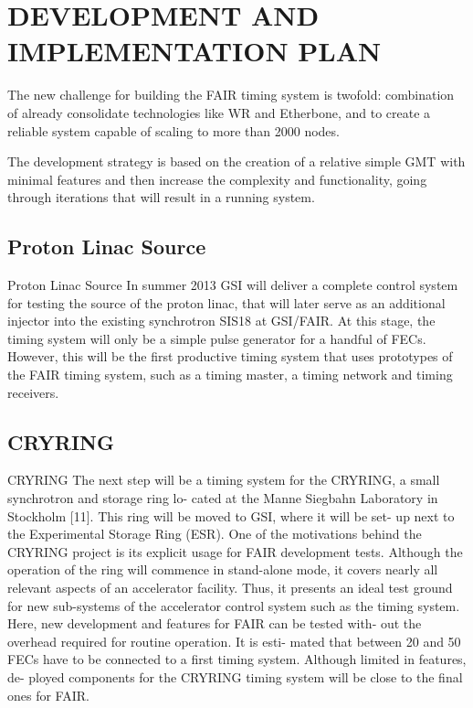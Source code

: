 \section{DEVELOPMENT AND IMPLEMENTATION PLAN}

The new challenge for building the FAIR timing system is
twofold: combination of already consolidate technologies like WR and 
Etherbone, and to create a reliable system capable of scaling
to more than 2000 nodes. 

The development strategy is based on the creation of a relative simple GMT 
with minimal features and then increase the complexity and functionality, going
through iterations that will result in a running system.

\subsection{Proton Linac Source}

Proton Linac Source In summer 2013 GSI will deliver a complete control 
system for testing the source of the proton linac, that will 
later serve as an additional injector
into the existing synchrotron SIS18 at GSI/FAIR. At this
stage, the timing system will only be a simple pulse generator 
for a handful of FECs. However, this will be the first
productive timing system that uses prototypes of the FAIR
timing system, such as a timing master, a timing network
and timing receivers.


\subsection{CRYRING}

CRYRING The next step will be a timing system for
the CRYRING, a small synchrotron and storage ring lo-
cated at the Manne Siegbahn Laboratory in Stockholm
[11]. This ring will be moved to GSI, where it will be set-
up next to the Experimental Storage Ring (ESR). One of
the motivations behind the CRYRING project is its explicit
usage for FAIR development tests. Although the operation
of the ring will commence in stand-alone mode, it covers
nearly all relevant aspects of an accelerator facility. Thus,
it presents an ideal test ground for new sub-systems of the
accelerator control system such as the timing system. Here,
new development and features for FAIR can be tested with-
out the overhead required for routine operation. It is esti-
mated that between 20 and 50 FECs have to be connected
to a first timing system. Although limited in features, de-
ployed components for the CRYRING timing system will
be close to the final ones for FAIR.

